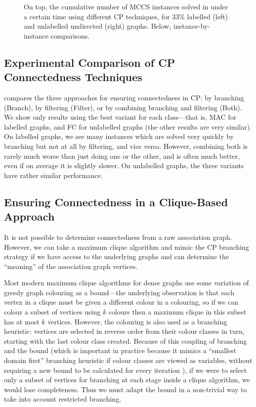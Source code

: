 \documentclass{llncs}
\begin{document}
\begin{figure}[tb]
    \centering
    

    \vspace*{0.5em}
    \centering
    
    \caption{On top, the cumulative number of MCCS instances solved in under a certain time using
        different CP techniques, for 33\% labelled (left) and unlabelled undirected (right) graphs.
    Below, instance-by-instance comparisons.}
        \label{figure:connected-cp}
\end{figure}

\subsection{Experimental Comparison of CP Connectedness Techniques}\label{mccs-cp-eval}

 compares the three approaches for ensuring connectedness in CP: by
branching (Branch), by filtering (Filter), or by combining branching and filtering (Both). We show
only results using the best variant for each class---that is, MAC for labelled graphs, and FC for
unlabelled graphs (the other results are very similar).  On labelled graphs, we see many instances
which are solved very quickly by branching but not at all by filtering, and vice versa.  However,
combining both is rarely much worse than just doing one or the other, and is often much better, even
if on average it is slightly slower.  On unlabelled graphs, the three variants have rather similar
performance.

\subsection{Ensuring Connectedness in a Clique-Based Approach}\label{mccs-clique}

It is not possible to determine connectedness from a raw association graph. However, we can take a
maximum clique algorithm and mimic the CP branching strategy if we have access to the underlying
graphs and can determine the ``meaning'' of the association graph vertices.

Most modern maximum clique algorithms for dense graphs use some variation of greedy graph colouring
as a bound---the underlying observation is that each vertex in a clique must be given a different
colour in a colouring, so if we can colour a subset of vertices using $k$ colours then a maximum
clique in this subset has at most $k$ vertices. However, the colouring is also used as a branching
heuristic: vertices are selected in reverse order from their colour classes in turn, starting with the
last colour class created. Because of this coupling of branching and the bound (which is important
in practice because it mimics a ``smallest domain first'' branching heuristic if colour classes are
viewed as variables, without requiring a new bound to be calculated for every iteration
\cite{DBLP:conf/cp/McCreeshP14}), if we were to select only a subset of vertices for branching at
each stage inside a clique algorithm, we would lose completeness. Thus we must adapt the bound in a
non-trivial way to take into account restricted branching.
\end{document}
